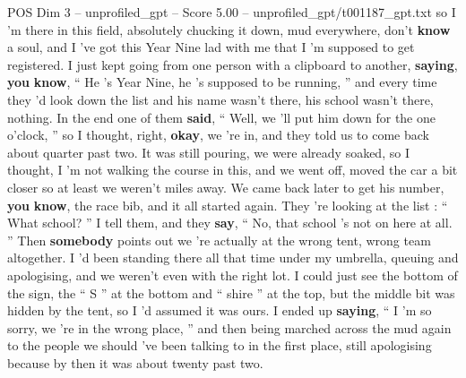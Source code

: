 \begin{textsample}{POS Dim 3 – unprofiled\_gpt – Score 5.00 – unprofiled\_gpt/t001187\_gpt.txt}  \label{ex:f3_pos_040}
so I ’m there in this field, absolutely chucking it down, mud everywhere, don't \textbf{know} a soul, and I ’ve got this Year Nine lad with me that I ’m supposed to get registered.
I just kept going from one person with a clipboard to another, \textbf{saying}, \textbf{you} \textbf{know}, “ He ’s Year Nine, he ’s supposed to be running, ” and every time they ’d look down the list and his name wasn't there, his school wasn't there, nothing.
In the end one of them \textbf{said}, “ Well, we ’ll put him down for the one o’clock, ” so I thought, right, \textbf{okay}, we ’re in, and they told us to come back about quarter past two.
It was still pouring, we were already soaked, so I thought, I ’m not walking the course in this, and we went off, moved the car a bit closer so at least we weren't miles away.
We came back later to get his number, \textbf{you} \textbf{know}, the race bib, and it all started again.
They ’re looking at the list : “ What school? ” I tell them, and they \textbf{say}, “ No, that school ’s not on here at all. ” Then \textbf{somebody} points out we ’re actually at the wrong tent, wrong team altogether.
I ’d been standing there all that time under my umbrella, queuing and apologising, and we weren't even with the right lot.
I could just see the bottom of the sign, the “ S ” at the bottom and “ shire ” at the top, but the middle bit was hidden by the tent, so I ’d assumed it was ours.
I ended up \textbf{saying}, “ I ’m so sorry, we ’re in the wrong place, ” and then being marched across the mud again to the people we should ’ve been talking to in the first place, still apologising because by then it was about twenty past two.

\end{textsample}

